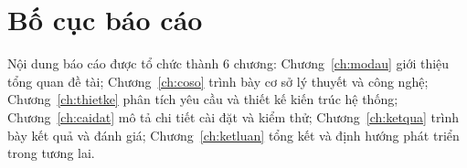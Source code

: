 \section{Bố cục báo cáo}

Nội dung báo cáo được tổ chức thành 6 chương: Chương~\ref{ch:modau} giới thiệu
tổng quan đề tài; Chương~\ref{ch:coso} trình bày cơ sở lý thuyết và công nghệ;
Chương~\ref{ch:thietke} phân tích yêu cầu và thiết kế kiến trúc hệ thống;
Chương~\ref{ch:caidat} mô tả chi tiết cài đặt và kiểm thử;
Chương~\ref{ch:ketqua} trình bày kết quả và đánh giá; Chương~\ref{ch:ketluan}
tổng kết và định hướng phát triển trong tương lai.

